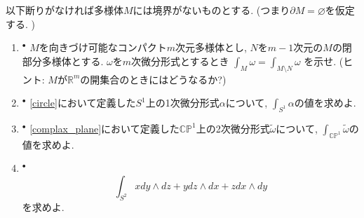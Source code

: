 \documentclass[dvipdfmx,a4paper,11pt]{article}
\newcommand{\R}{\mathbb{R}}
\newcommand{\C}{\mathbb{C}}
\newcommand{\Supp}{{\rm Supp}}
\theoremstyle{definition}
\begin{document}



以下断りがなければ多様体$M$には境界がないものとする. (つまり$\partial M = \varnothing$を仮定する. )

\vspace{11pt}
\begin{enumerate}[label=\textbf{問}\ref*{sec-stokes}.\arabic*]





\item $^\bullet$ $M$を向きづけ可能なコンパクト$m$次元多様体とし, $N $を$m-1$次元の$M$の閉部分多様体とする. $\omega$を$m$次微分形式とするとき
$
\int_{M} \omega = \int_{M \setminus N} \omega
$
を示せ. (ヒント: $M$が$\R^m$の開集合のときにはどうなるか?)

\item $^\bullet$ \ref{circle}において定義した$S^1$上の1次微分形式$\alpha$について, $\int_{S^1 } \alpha$の値を求めよ.

\item $^\bullet$ \ref{complax_plane}において定義した$\C\mathbb{P}^1$上の2次微分形式$\widetilde{\omega}$について, $\int_{\C\mathbb{P}^1 } \widetilde{\omega}$の値を求めよ.

\newpage

\item $^{\bullet}$ $$\int_{S^2} x dy \wedge dz + y dz \wedge dx + z dx \wedge dy$$を求めよ. 


\end{enumerate}
\end{document}
